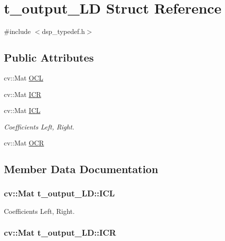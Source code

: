 \hypertarget{structt__output__LD}{}\section{t\+\_\+output\+\_\+\+LD Struct Reference}
\label{structt__output__LD}


{\ttfamily \#include $<$dsp\+\_\+typedef.\+h$>$}

\subsection*{Public Attributes}
\begin{DoxyCompactItemize}
\item 
cv\+::\+Mat \hyperlink{structt__output__LD_a5df4d82612808126e652c4aeb217d2df}{O\+CL}
\item 
cv\+::\+Mat \hyperlink{structt__output__LD_acbcea5e0f185edb9040c7f27b70f8750}{I\+CR}
\item 
cv\+::\+Mat \hyperlink{structt__output__LD_a9e9dc549809106d57ed9fa408eab05ba}{I\+CL}
\begin{DoxyCompactList}\small\item\em Coefficients Left, Right. \end{DoxyCompactList}\item 
cv\+::\+Mat \hyperlink{structt__output__LD_a42f844f6c822a86f44f57e4ae0a58bb2}{O\+CR}
\end{DoxyCompactItemize}


\subsection{Member Data Documentation}
\subsubsection[{\texorpdfstring{I\+CL}{ICL}}]{\setlength{\rightskip}{0pt plus 5cm}cv\+::\+Mat t\+\_\+output\+\_\+\+L\+D\+::\+I\+CL}\hypertarget{structt__output__LD_a9e9dc549809106d57ed9fa408eab05ba}{}\label{structt__output__LD_a9e9dc549809106d57ed9fa408eab05ba}


Coefficients Left, Right. 

\subsubsection[{\texorpdfstring{I\+CR}{ICR}}]{\setlength{\rightskip}{0pt plus 5cm}cv\+::\+Mat t\+\_\+output\+\_\+\+L\+D\+::\+I\+CR}\hypertarget{structt__output__LD_acbcea5e0f185edb9040c7f27b70f8750}{}\label{structt__output__LD_acbcea5e0f185edb9040c7f27b70f8750}

